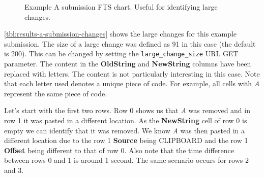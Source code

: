 \begin{figure}[H]
  \centering
  \caption[Submission Results A Chart]{Example A submission FTS chart. Useful for identifying large changes.}
  \label{fig:results-a-submission-chart}
\end{figure}

\newpage

\autoref{tbl:results-a-submission-changes} shows the large changes for this example submission. The size of a large change was defined as 91 in this case (the default is 200). This can be changed by setting the \texttt{large\_change\_size} URL GET parameter. The content in the \textbf{OldString} and \textbf{NewString} columns have been replaced with letters. The content is not particularly interesting in this case. Note that each letter used denotes a unique piece of code. For example, all cells with \textit{A} represent the same piece of code.

Let's start with the first two rows. Row 0 shows us that \textit{A} was removed and in row 1 it was pasted in a different location. As the \textbf{NewString} cell of row 0 is empty we can identify that it was removed. We know \textit{A} was then pasted in a different location due to the row 1 \textbf{Source} being CLIPBOARD and the row 1 \textbf{Offset} being different to that of row 0. Also note that the time difference between rows 0 and 1 is around 1 second. The same scenario occurs for rows 2 and 3.

